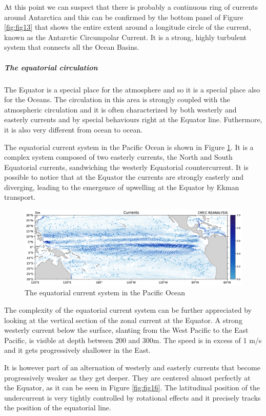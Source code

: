 At this point we can suspect that there is probably a continuous ring of currents around Antarctica and this can be confirmed by the bottom panel of Figure \ref{fig:fig13}  that shows the entire extent around a
longitude circle of the current, known as the Antarctic Circumpolar
Current. It is a strong, highly turbulent system that connects all the
Ocean Basins.
\\

\subparagraph{The equatorial
	circulation}

The Equator is a special place for the atmosphere and so it is a special
place also for the Oceans. The circulation in this area is strongly
coupled with the atmospheric circulation and it is often characterized
by both westerly and easterly currents and by special behaviours right
at the Equator line. Futhermore, it is also very different from ocean to
ocean.

The equatorial current system in the Pacific Ocean is shown in Figure \ref{fig:fig14}. It is a complex system composed of two easterly
currents, the North and South Equatorial currents, sandwiching the
westerly Equatorial countercurrent. It is possible to notice that at the
Equator the currents are strongly easterly and diverging, leading to the
emergence of upwelling at the Equator by Ekman transport.

\begin{figure}[htpb]
	\centering
	\includegraphics[width = 0.4 \textwidth]{upload/39image.png}
	\caption{The equatorial current system in the Pacific Ocean} \label{fig:fig14}
\end{figure}

The complexity of the equatorial current system can be further
appreciated by looking at the vertical section of the zonal current at
the Equator. A strong westerly current below the
surface, slanting from the West Pacific to the East Pacific, is visible
at depth between 200 and 300m. The speed is in excess of 1 m/s and it
gets progressively shallower in the East.

It is however part of an alternation of westerly and easterly currents
that become progressively weaker as they get deeper. They are centered
almost perfectly at the Equator, as it can be seen in Figure \ref{fig:fig16}. The latitudinal position of the undercurrent is very tightly controlled by rotational effects and it precisely tracks the position of the equatorial line.

